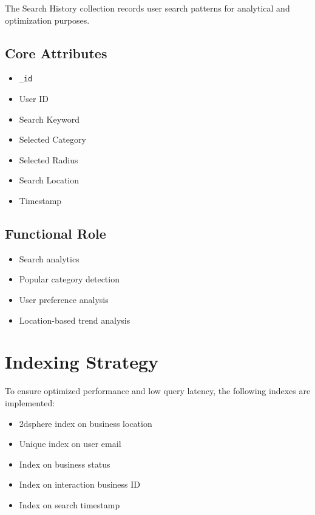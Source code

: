 \documentclass[12pt,a4paper]{report}
\begin{document}
The Search History collection records user search patterns for analytical and optimization purposes.

\subsection*{Core Attributes}

\begin{itemize}

\item \texttt{\_id}

\item User ID

\item Search Keyword

\item Selected Category

\item Selected Radius

\item Search Location

\item Timestamp

\end{itemize}

\subsection*{Functional Role}

\begin{itemize}

\item Search analytics

\item Popular category detection

\item User preference analysis

\item Location-based trend analysis

\end{itemize}

\section{Indexing Strategy}

To ensure optimized performance and low query latency, the following indexes are implemented:

\begin{itemize}

\item 2dsphere index on business location

\item Unique index on user email

\item Index on business status

\item Index on interaction business ID

\item Index on search timestamp

\end{itemize}
\end{document}
